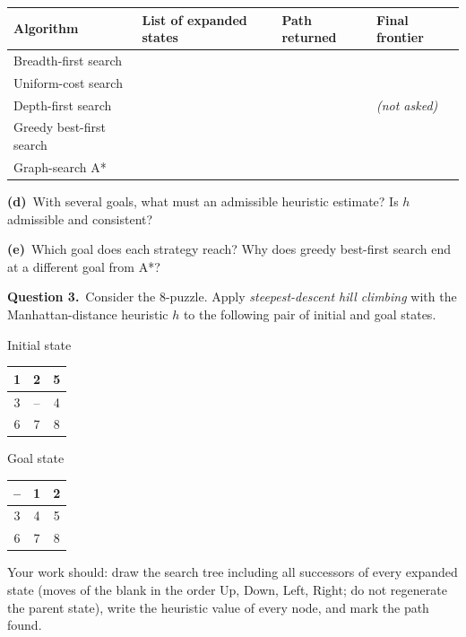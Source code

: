 \documentclass[11pt,a4paper]{article}
\newcommand{\question}[1]{\par\medskip\noindent\textbf{Question #1.}\ }
\newcommand{\subq}[1]{\par\smallskip\noindent\textbf{#1}\ }
\begin{document}
\begin{center}\small\begin{tabularx}{\linewidth}{|>{\raggedright}p{2.6cm}|>{\raggedright}X|>{\raggedright}p{3.6cm}|>{\raggedright\arraybackslash}p{2.6cm}|}\hline
\textbf{Algorithm} & \textbf{List of expanded states} & \textbf{Path returned} & \textbf{Final frontier}\\ \hline
Breadth-first search & & & \\[8mm] \hline
Uniform-cost search & & & \\[8mm] \hline
Depth-first search & & & \textit{(not asked)}\\[8mm] \hline
Greedy best-first search & & & \\[8mm] \hline
Graph-search A* & & & \\[8mm] \hline
\end{tabularx}\end{center}
\subq{(d)}With several goals, what must an admissible heuristic estimate? Is $h$ admissible and consistent?
\begin{ansbox}[height=1.6cm]\end{ansbox}
\subq{(e)}Which goal does each strategy reach? Why does greedy best-first search end at a different goal from A*?
\begin{ansbox}[height=1.8cm]\end{ansbox}
\clearpage
\question{3}Consider the 8-puzzle. Apply \emph{steepest-descent hill climbing} with the Manhattan-distance heuristic $h$ to the following pair of initial and goal states.\begin{center}Initial state\quad \begin{tabular}{|c|c|c|}\hline 1 & 2 & 5\\\hline 3 & -- & 4\\\hline 6 & 7 & 8\\\hline\end{tabular}\qquad\qquad Goal state\quad \begin{tabular}{|c|c|c|}\hline -- & 1 & 2\\\hline 3 & 4 & 5\\\hline 6 & 7 & 8\\\hline\end{tabular}\end{center}Your work should: draw the search tree including all successors of every expanded state (moves of the blank in the order Up, Down, Left, Right; do not regenerate the parent state), write the heuristic value of every node, and mark the path found.
\par\smallskip\noindent 
\end{document}
